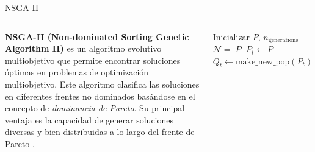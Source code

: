 \documentclass[aspectratio=169,xcolor=dvipsnames]{beamer}
\begin{document}

\begin{frame}{NSGA-II}
    \begin{columns}[T] %
        \justifying %
        \textbf{NSGA-II (Non-dominated Sorting Genetic Algorithm II)} es un algoritmo evolutivo multiobjetivo que permite encontrar soluciones óptimas en problemas de optimización multiobjetivo. Este algoritmo clasifica las soluciones en diferentes frentes no dominados basándose en el concepto de \textit{dominancia de Pareto}. Su principal ventaja es la capacidad de generar soluciones diversas y bien distribuidas a lo largo del frente de Pareto \cite{Deb}.
        \vspace{1em} %

        \scriptsize %
        \begin{algorithm}[H]
            \caption{NSGA-II Algorithm}\label{alg:nsga2}
            Inicializar $P$, $n_{\text{generations}}$  \\
            $\mathcal{N} = |P|$\;
            $P_t \gets P$\;
            $Q_t \gets \text{make\_new\_pop}(P_t)$\;
        \end{algorithm}
    \end{columns}
\end{frame}
\end{document}
